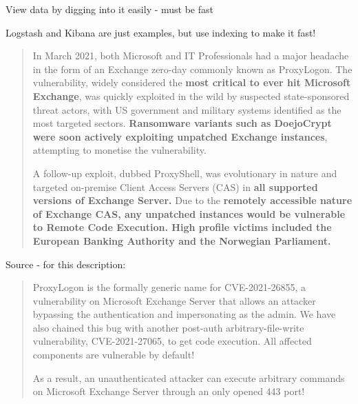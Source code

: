 \documentclass[Screen16to9,17pt]{foils}
\begin{document}


\begin{list1}
\item View data by digging into it easily - must be fast
\item Logstash and Kibana are just examples, but use indexing to make it fast!
\end{list1}





%

\begin{quote}

In March 2021, both Microsoft and IT Professionals had a major headache in the form of an Exchange zero-day commonly known as ProxyLogon. The vulnerability, widely considered the {\bf most critical to ever hit Microsoft Exchange}, was quickly exploited in the wild by suspected state-sponsored threat actors, with US government and military systems identified as the most targeted sectors. {\bf Ransomware variants such as DoejoCrypt were soon actively exploiting unpatched Exchange instances}, attempting to monetise the vulnerability.

A follow-up exploit, dubbed ProxyShell, was evolutionary in nature and targeted on-premise Client Access Servers (CAS) in {\bf all supported versions of Exchange Server.} Due to the {\bf remotely accessible nature of Exchange CAS, any unpatched instances would be vulnerable to Remote Code Execution. High profile victims included the European Banking Authority and the Norwegian Parliament.}
\end{quote}
Source - for this description:\\



\begin{quote}
ProxyLogon is the formally generic name for CVE-2021-26855, a vulnerability on Microsoft Exchange Server that allows an attacker bypassing the authentication and impersonating as the admin. We have also chained this bug with another post-auth arbitrary-file-write vulnerability, CVE-2021-27065, to get code execution. All affected components are vulnerable by default!

As a result, an unauthenticated attacker can execute arbitrary commands on Microsoft Exchange Server through an only opened 443 port!
\end{quote}
\end{document}
